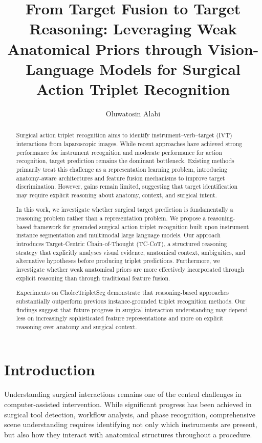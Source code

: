 \documentclass[11pt]{article}
\title{From Target Fusion to Target Reasoning: Leveraging Weak Anatomical Priors through Vision-Language Models for Surgical Action Triplet Recognition}
\author{Oluwatosin Alabi}
\date{}
\begin{document}
\maketitle




\begin{abstract}

Surgical action triplet recognition aims to identify instrument--verb--target (IVT) interactions from laparoscopic images. While recent approaches have achieved strong performance for instrument recognition and moderate performance for action recognition, target prediction remains the dominant bottleneck. Existing methods primarily treat this challenge as a representation learning problem, introducing anatomy-aware architectures and feature fusion mechanisms to improve target discrimination. However, gains remain limited, suggesting that target identification may require explicit reasoning about anatomy, context, and surgical intent.

In this work, we investigate whether surgical target prediction is fundamentally a reasoning problem rather than a representation problem. We propose a reasoning-based framework for grounded surgical action triplet recognition built upon instrument instance segmentation and multimodal large language models. Our approach introduces Target-Centric Chain-of-Thought (TC-CoT), a structured reasoning strategy that explicitly analyses visual evidence, anatomical context, ambiguities, and alternative hypotheses before producing triplet predictions. Furthermore, we investigate whether weak anatomical priors are more effectively incorporated through explicit reasoning than through traditional feature fusion.

Experiments on CholecTripletSeg demonstrate that reasoning-based approaches substantially outperform previous instance-grounded triplet recognition methods. Our findings suggest that future progress in surgical interaction understanding may depend less on increasingly sophisticated feature representations and more on explicit reasoning over anatomy and surgical context.

\end{abstract}

\section{Introduction}

Understanding surgical interactions remains one of the central challenges in computer-assisted intervention. While significant progress has been achieved in surgical tool detection, workflow analysis, and phase recognition, comprehensive scene understanding requires identifying not only which instruments are present, but also how they interact with anatomical structures throughout a procedure.
\end{document}
